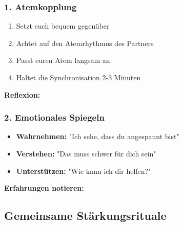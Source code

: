\begin{ctmmGreenBox}[title=Praktische Übungen]

\subsubsection{1. Atemkopplung}
\begin{enumerate}
    \item Setzt euch bequem gegenüber
    \item Achtet auf den Atemrhythmus des Partners
    \item Passt euren Atem langsam an
    \item Haltet die Synchronisation 2-3 Minuten
\end{enumerate}

\textbf{Reflexion:} \\

\subsubsection{2. Emotionales Spiegeln}
\begin{itemize}
    \item \textbf{Wahrnehmen:} "Ich sehe, dass du angespannt bist"
    \item \textbf{Verstehen:} "Das muss schwer für dich sein"  
    \item \textbf{Unterstützen:} "Wie kann ich dir helfen?"
\end{itemize}

\textbf{Erfahrungen notieren:} \\

\end{ctmmGreenBox}

\subsection{Gemeinsame Stärkungsrituale}

